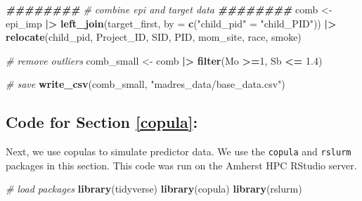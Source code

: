 \documentclass[12pt, twoside]{amherstthesis}
\newenvironment{Shaded}{\begin{snugshade}}{\end{snugshade}}
\newcommand{\AttributeTok}[1]{\textcolor[rgb]{0.13,0.29,0.53}{#1}}
\newcommand{\CommentTok}[1]{\textcolor[rgb]{0.56,0.35,0.01}{\textit{#1}}}
\newcommand{\DecValTok}[1]{\textcolor[rgb]{0.00,0.00,0.81}{#1}}
\newcommand{\DocumentationTok}[1]{\textcolor[rgb]{0.56,0.35,0.01}{\textbf{\textit{#1}}}}
\newcommand{\FloatTok}[1]{\textcolor[rgb]{0.00,0.00,0.81}{#1}}
\newcommand{\FunctionTok}[1]{\textcolor[rgb]{0.13,0.29,0.53}{\textbf{#1}}}
\newcommand{\NormalTok}[1]{#1}
\newcommand{\OtherTok}[1]{\textcolor[rgb]{0.56,0.35,0.01}{#1}}
\newcommand{\SpecialCharTok}[1]{\textcolor[rgb]{0.81,0.36,0.00}{\textbf{#1}}}
\newcommand{\StringTok}[1]{\textcolor[rgb]{0.31,0.60,0.02}{#1}}
\begin{document}
\scriptsize
\begin{Shaded}
\begin{Highlighting}[]
\DocumentationTok{\#\#\#\#\#\#\#\#}
\CommentTok{\# combine epi and target data}
\DocumentationTok{\#\#\#\#\#\#\#\#}
\NormalTok{comb }\OtherTok{\textless{}{-}}\NormalTok{ epi\_imp }\SpecialCharTok{|\textgreater{}} 
  \FunctionTok{left\_join}\NormalTok{(target\_first, }\AttributeTok{by =} \FunctionTok{c}\NormalTok{(}\StringTok{"child\_pid"} \OtherTok{=} \StringTok{"child\_PID"}\NormalTok{)) }\SpecialCharTok{|\textgreater{}} 
  \FunctionTok{relocate}\NormalTok{(child\_pid, Project\_ID, SID, PID, mom\_site, race, smoke) }

\CommentTok{\# remove outliers}
\NormalTok{comb\_small }\OtherTok{\textless{}{-}}\NormalTok{ comb }\SpecialCharTok{|\textgreater{}} 
  \FunctionTok{filter}\NormalTok{(Mo }\SpecialCharTok{\textgreater{}=}\DecValTok{1}\NormalTok{, Sb }\SpecialCharTok{\textless{}=} \FloatTok{1.4}\NormalTok{)}

\CommentTok{\# save}
\FunctionTok{write\_csv}\NormalTok{(comb\_small, }\StringTok{"madres\_data/base\_data.csv"}\NormalTok{)}
\end{Highlighting}
\end{Shaded}
\normalsize

\hypertarget{code-for-section-refcopula}{%
\subsection{Code for Section \ref{copula}:}\label{code-for-section-refcopula}}

Next, we use copulas to simulate predictor data. We use the \texttt{copula} and \texttt{rslurm} packages in this section. This code was run on the Amherst HPC RStudio server.

\scriptsize
\begin{Shaded}
\begin{Highlighting}[]
\CommentTok{\# load packages}
\FunctionTok{library}\NormalTok{(tidyverse)}
\FunctionTok{library}\NormalTok{(copula)}
\FunctionTok{library}\NormalTok{(rslurm)}
\end{Highlighting}
\end{Shaded}
\normalsize
\end{document}
